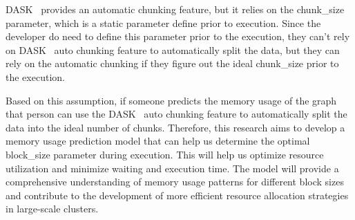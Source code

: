 DASK~\cite{dask} provides an automatic chunking feature, but it relies on the chunk\_size parameter, which is a static parameter define prior to execution.
Since the developer do need to define this parameter prior to the execution, they can't rely on DASK~\cite{dask} auto chunking feature to automatically split the data, but they can rely on the automatic chunking if they figure out the ideal chunk\_size prior to the execution.

Based on this assumption, if someone predicts the memory usage of the graph that person can use the DASK~\cite{dask} auto chunking feature to automatically split the data into the ideal number of chunks.
Therefore, this research aims to develop a memory usage prediction model that can help us determine the optimal block\_size parameter during execution.
This will help us optimize resource utilization and minimize waiting and execution time.
The model will provide a comprehensive understanding of memory usage patterns for different block sizes and contribute to the development of more efficient resource allocation strategies in large-scale clusters.

